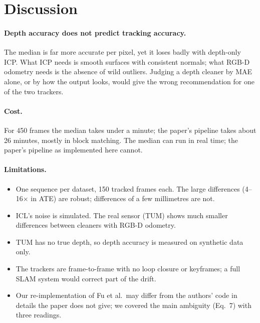 \documentclass[11pt,a4paper]{article}
\begin{document}
\section{Discussion}

\paragraph{Depth accuracy does not predict tracking accuracy.}
The median is far more accurate per pixel, yet it loses badly with depth-only ICP. What ICP needs is smooth surfaces
with consistent normals; what RGB-D odometry needs is the absence of wild outliers. Judging a depth cleaner by
MAE alone, or by how the output looks, would give the wrong recommendation for one of the two trackers.

\paragraph{Cost.}
For 450 frames the median takes under a minute; the paper's pipeline takes about 26 minutes, mostly in block matching.
The median can run in real time; the paper's pipeline as implemented here cannot.

\paragraph{Limitations.}
\begin{itemize}
  \item One sequence per dataset, 150 tracked frames each. The large differences (4--16$\times$ in ATE) are robust;
        differences of a few millimetres are not.
  \item ICL's noise is simulated. The real sensor (TUM) shows much smaller differences between cleaners with RGB-D
        odometry.
  \item TUM has no true depth, so depth accuracy is measured on synthetic data only.
  \item The trackers are frame-to-frame with no loop closure or keyframes; a full SLAM system would correct part of
        the drift.
  \item Our re-implementation of Fu et al.\ may differ from the authors' code in details the paper does not give;
        we covered the main ambiguity (Eq.\ 7) with three readings.
\end{itemize}

\end{document}
